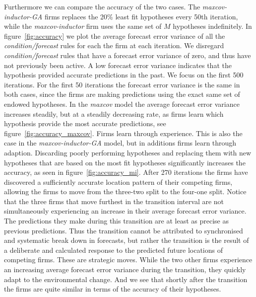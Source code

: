 \documentclass[preprint, 12pt]{elsarticle}
\begin{document}
Furthermore we can compare the accuracy of the two cases. The \emph{maxcov-inductor-GA} firms replaces the 20\% least fit hypotheses every 50th iteration, while the \emph{maxcov-inductor} firm uses the same set of $M$ hypotheses indefinitely. In figure~\ref{fig:accuracy} we plot the average forecast error variance of all the \emph{condition/forecast} rules for each the firm at each iteration. We disregard \emph{condition/forecast} rules that have a forecast error variance of zero, and thus have not previously been active. A low forecast error variance indicates that the hypothesis provided accurate predictions in the past. We focus on the first 500 iterations. For the first 50 iterations the forecast error variance is the same in both cases, since the firms are making predictions using the exact same set of endowed hypotheses. In the \emph{maxcov} model the average forecast error variance increases steadily, but at a steadily decreasing rate, as firms learn which hypothesis provide the most accurate predictions, see figure~\ref{fig:accuracy_maxcov}. Firms learn through experience. This is also the case in the \emph{maxcov-inductor-GA} model, but in additions firms learn through adaption. Discarding poorly performing hypotheses and replacing them with new hypotheses that are based on the most fit hypotheses significantly increases the accuracy, as seen in figure~\ref{fig:accuracy_mi}. After 270 iterations the firms have discovered a sufficiently accurate location pattern of their competing firms, allowing the firms to move from the three-two split to the four-one split. Notice that the three firms that move furthest in the transition interval are not simultaneously experiencing an increase in their average forecast error variance. The predictions they make during this transition are at least as precise as previous predictions. Thus the transition cannot be attributed to synchronised and systematic break down in forecasts, but rather the transition is the result of a deliberate and calculated response to the predicted future locations of competing firms. These are strategic moves. While the two other firms experience an increasing average forecast error variance during the transition, they quickly adapt to the environmental change. And we see that shortly after the transition the firms are quite similar in terms of the accuracy of their hypotheses.
\end{document}
